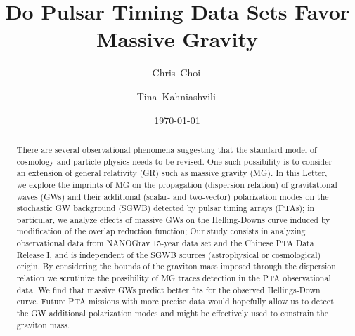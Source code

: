\documentclass[prd,twocolumn,aps,psfig,nofootinbib,nobibnotes,superscriptaddress,preprintnumbers,times]{revtex4-2}
\newcommand{\eV}{\,{\rm eV}}
\begin{document}
\title{Do Pulsar Timing Data Sets Favor Massive Gravity}

\date{\today}
\author{Chris~Choi\,}

\author{Tina~Kahniashvili\,}

\begin{abstract}
There are several observational phenomena suggesting that the standard model of cosmology and particle physics needs to be revised. One such possibility is to consider an extension of general relativity (GR) such as massive gravity (MG). In this Letter, we explore the imprints of MG on the propagation (dispersion relation) of gravitational waves (GWs) and their additional (scalar- and two-vector) polarization modes on the stochastic GW background (SGWB) detected by pulsar timing arrays (PTAs); in particular, we analyze effects of massive GWs on the Helling-Downs curve induced by modification of the overlap reduction function; Our study consists in analyzing observational data from NANOGrav 15-year data set and the Chinese PTA Data Release I, and is independent of the SGWB sources (astrophysical or cosmological) origin.   
By considering the bounds of the graviton mass imposed through the dispersion relation 
we scrutinize the possibility of MG traces detection in the PTA observational data. 
We find that massive GWs predict better fits for the observed Hellings-Down curve. Future PTA missions %
with more precise data would hopefully allow us to detect the GW additional polarization modes and 
might be effectively used to constrain the graviton mass.
\end{abstract}
\end{document}
